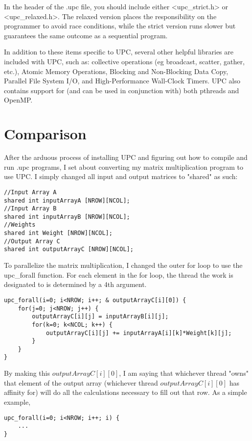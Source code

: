 \documentclass{article}
\begin{document}
In the header of the .upc file, you should include either <upc\_strict.h> or <upc\_relaxed.h>. The relaxed version places the responsibility on the programmer to avoid race conditions, while the strict version runs slower but guarantees the same outcome as a sequential program.

In addition to these items specific to UPC, several other helpful libraries are included with UPC, such as: collective operations (eg broadcast, scatter, gather, etc.), Atomic Memory Operations, Blocking and Non-Blocking Data Copy, Parallel File System I/O, and High-Performance Wall-Clock Timers. UPC also contains support for (and can be used in conjunction with) both pthreads and OpenMP.

\section{Comparison}

After the arduous process of installing UPC and figuring out how to compile and run .upc programs, I set about converting my matrix multiplication program to use UPC. I simply changed all input and output matrices to "shared" as such:

\begin{lstlisting}
//Input Array A
shared int inputArrayA [NROW][NCOL];
//Input Array B
shared int inputArrayB [NROW][NCOL];
//Weights
shared int Weight [NROW][NCOL];
//Output Array C
shared int outputArrayC [NROW][NCOL];
\end{lstlisting}

To parallelize the matrix multiplication, I changed the outer for loop to use the upc\_forall function. For each element in the for loop, the thread the work is designated to is determined by a 4th argument.

\begin{lstlisting}
upc_forall(i=0; i<NROW; i++; & outputArrayC[i][0]) {
    for(j=0; j<NROW; j++) {
        outputArrayC[i][j] = inputArrayB[i][j];
        for(k=0; k<NCOL; k++) {
            outputArrayC[i][j] += inputArrayA[i][k]*Weight[k][j];
        }
    }
}
\end{lstlisting}

 By making this $outputArrayC[i][0]$, I am saying that whichever thread "owns" that element of the output array (whichever thread $outputArrayC[i][0]$ has affinity for) will do all the calculations necessary to fill out that row. As a simple example,
 
\begin{lstlisting}
upc_forall(i=0; i<NROW; i++; i) {
    ...
}
\end{lstlisting}
\end{document}
